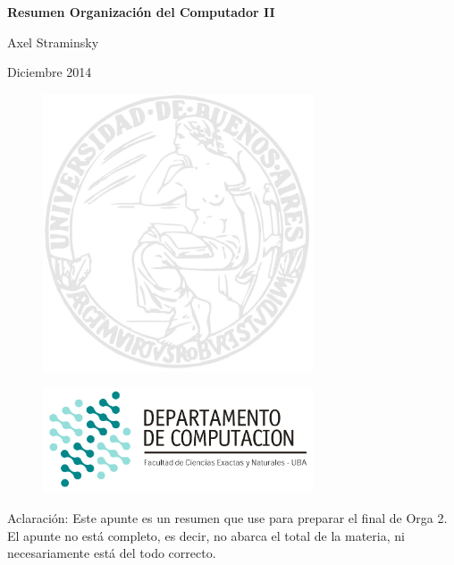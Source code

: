 \documentclass[a4paper,10pt]{article}
\begin{document}
\begin{center}
\begin{Large}
\textbf{Resumen Organizaci\'on del Computador II}
\end{Large}
\end{center}
\begin{center}
Axel Straminsky
\end{center}


\begin{center}
Diciembre 2014
\end{center}

\vspace*{11\baselineskip}


\begin{center}
\begin{figure}[htb]
\begin{center}
\includegraphics[width=8cm]{./logo_uba}
\end{center}
\end{figure}
\end{center}


\begin{center}
\begin{figure}[htb]
\begin{center}
\includegraphics[width=8cm]{./logo_dc}
\end{center}
\end{figure}
\end{center}



\vspace*{8\baselineskip}


Aclaraci\'on: Este apunte es un resumen que use para preparar el final de Orga 2. El apunte no est\'a completo, es decir, no abarca el total
de la materia, ni necesariamente est\'a del todo correcto.

\newpage

\tableofcontents

\newpage


\newpage

\end{document}
